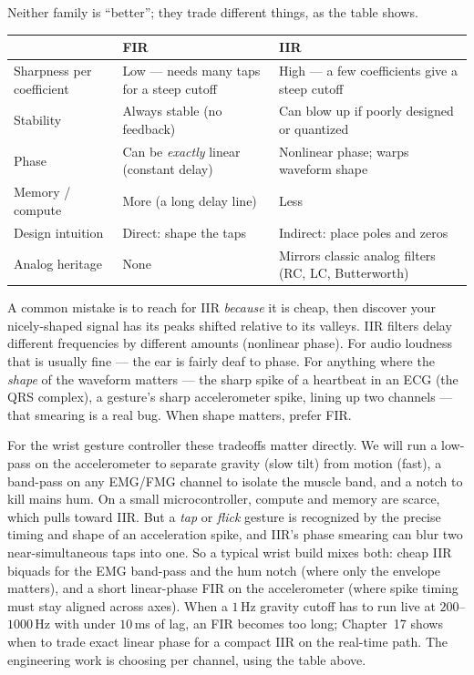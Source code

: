 Neither family is ``better''; they trade different things, as the table
shows.

\begin{center}
\renewcommand{\arraystretch}{1.3}
\begin{tabular}{p{4.1cm} p{4.5cm} p{4.5cm}}
\toprule
 & \textbf{FIR} & \textbf{IIR} \\
\midrule
Sharpness per coefficient & Low --- needs many taps for a steep cutoff
 & High --- a few coefficients give a steep cutoff \\
Stability & Always stable (no feedback) & Can blow up if poorly designed or
 quantized \\
Phase & Can be \emph{exactly} linear (constant delay) & Nonlinear phase; warps
 waveform shape \\
Memory / compute & More (a long delay line) & Less \\
Design intuition & Direct: shape the taps & Indirect: place poles and zeros \\
Analog heritage & None & Mirrors classic analog filters (RC, LC,
 Butterworth) \\
\bottomrule
\end{tabular}
\end{center}

\begin{trapbox}
A common mistake is to reach for IIR \emph{because} it is cheap, then discover
your nicely-shaped signal has its peaks shifted relative to its valleys. IIR
filters delay different frequencies by different amounts (nonlinear phase). For
audio loudness that is usually fine --- the ear is fairly deaf to phase. For
anything where the \emph{shape} of the waveform matters --- the sharp spike of a heartbeat in an ECG (the QRS complex), a
gesture's sharp accelerometer spike, lining up two channels --- that smearing is a
real bug. When shape matters, prefer FIR.
\end{trapbox}

\begin{goalbox}
For the wrist gesture controller these tradeoffs matter directly. We will run a
low-pass on the accelerometer to separate gravity (slow tilt) from motion (fast),
a band-pass on any EMG/FMG channel to isolate the muscle band, and a notch to kill
mains hum. On a small microcontroller, compute and memory are scarce, which pulls
toward IIR. But a \emph{tap} or \emph{flick} gesture is recognized by the precise
timing and shape of an acceleration spike, and IIR's phase smearing can blur two
near-simultaneous taps into one. So a typical wrist build mixes both: cheap IIR
biquads for the EMG band-pass and the hum notch (where only the envelope matters),
and a short linear-phase FIR on the accelerometer (where spike timing must stay
aligned across axes). When a $1$\,Hz gravity cutoff has to run live at $200$--$1000$\,Hz with under $10$\,ms of lag, an FIR becomes too long; Chapter~17 shows when to trade exact linear phase for a compact IIR on the real-time path. The engineering work is choosing per channel, using the table
above.
\end{goalbox}

